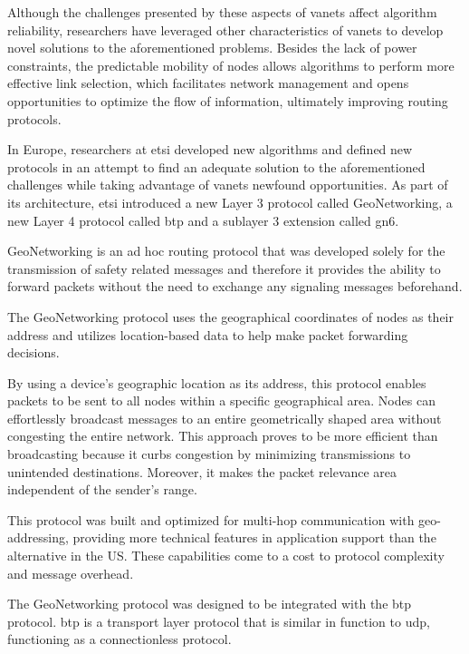 Although the challenges presented by these aspects of \glspl{vanet} affect algorithm reliability, researchers have leveraged other characteristics of \glspl{vanet} to develop novel solutions to the aforementioned problems. Besides the lack of power constraints, the predictable mobility of nodes allows algorithms to perform more effective link selection, which facilitates network management and opens opportunities to optimize the flow of information, ultimately improving routing protocols.

In Europe, researchers at \gls{etsi} developed new algorithms and defined new protocols in an attempt to find an adequate solution to the aforementioned challenges while taking advantage of \glspl{vanet} newfound opportunities. As part of its architecture, \gls{etsi} introduced a new Layer 3 protocol called GeoNetworking\cite{etsi_intelligent_2014-1}\cite{etsi_intelligent_2013-1}\cite{etsi_intelligent_2014}\cite{etsi_intelligent_2020-1}\cite{etsi_intelligent_2019}\cite{etsi_intelligent_2014-2}, a new Layer 4 protocol called \gls{btp}\cite{etsi_intelligent_2019} and a sublayer 3 extension called \gls{gn6}\cite{etsi_intelligent_2014-2}.

GeoNetworking is an ad hoc routing protocol that was developed solely for the transmission of safety related messages and therefore it provides the ability to forward packets without the need to exchange any signaling messages beforehand.

The GeoNetworking protocol uses the geographical coordinates of nodes as their address and utilizes location-based data to help make packet forwarding decisions. 

By using a device's geographic location as its address, this protocol enables packets to be sent to all nodes within a specific geographical area. Nodes can effortlessly broadcast messages to an entire geometrically shaped area without congesting the entire network. This approach proves to be more efficient than broadcasting because it curbs congestion by minimizing transmissions to unintended destinations. Moreover, it makes the packet relevance area independent of the sender's range.

This protocol was built and optimized for multi-hop communication with geo-addressing, providing more technical features in application support than the alternative in the US. These capabilities come to a cost to protocol complexity and message overhead\cite{festag_standards_2015}.

The GeoNetworking protocol was designed to be integrated with the \gls{btp} protocol. \gls{btp} is a transport layer protocol that is similar in function to \gls{udp}, functioning as a connectionless protocol\cite{festag_cooperative_2014}.

